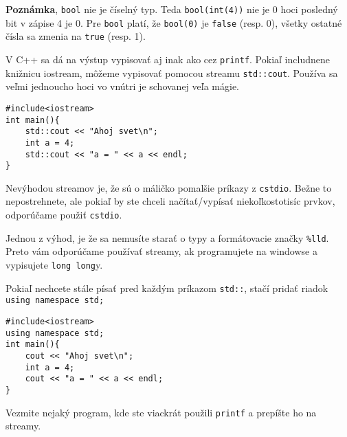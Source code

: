 \textbf{Poznámka}, \verb!bool! nie je číselný typ. Teda \verb!bool(int(4))! nie
je 0 hoci posledný bit v zápise 4 je 0.  Pre \verb!bool! platí, že
\verb!bool(0)! je \verb!false! (resp. 0), všetky ostatné čísla sa zmenia na
\verb!true! (resp. 1).


V C++ sa dá na výstup vypisovať aj inak ako cez \verb!printf!. Pokiaľ
includnene knižnicu iostream, môžeme vypisovať pomocou streamu
\verb!std::cout!. Používa sa veľmi jednoucho hoci vo vnútri je schovanej veľa
mágie.

\begin{lstlisting}
#include<iostream>
int main(){
    std::cout << "Ahoj svet\n";
    int a = 4;
    std::cout << "a = " << a << endl;
}
\end{lstlisting}

Nevýhodou streamov je, že sú o máličko pomalšie príkazy z \verb!cstdio!.  Bežne
to nepostrehnete, ale pokiaľ by ste chceli načítať/vypísať niekoľkostotisíc
prvkov, odporúčame použiť \verb!cstdio!.

Jednou z výhod, je že sa nemusíte starať o typy a formátovacie značky
\verb"%lld". Preto vám odporúčame používať streamy, ak programujete na windowse
a vypisujete \verb!long long!y.

Pokiaľ nechcete stále písať pred každým príkazom \verb!std::!, stačí pridať
riadok \verb!using namespace std;!

\begin{lstlisting}
#include<iostream>
using namespace std;
int main(){
    cout << "Ahoj svet\n";
    int a = 4;
    cout << "a = " << a << endl;
}
\end{lstlisting}

\cvicenie Vezmite nejaký program, kde ste viackrát použili \verb!printf! a
prepíšte ho na streamy.
\fakeriesenie




